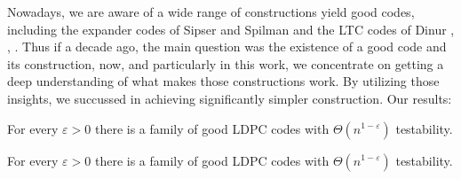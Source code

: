 
  Nowadays, we are aware of a wide range of constructions yield good codes, including the expander codes of Sipser and Spilman \cite{ExpanderCodes} and the LTC codes of Dinur \cite{Dinur}, \cite{Pavel}, \cite{leverrier2022quantum}. Thus if a decade ago, the main question was the existence of a good code and its construction, now, and particularly in this work, we concentrate on getting a deep understanding of what makes those constructions work. By utilizing those insights, we succussed in achieving significantly simpler construction. Our results: 

  \begin{theorem} \label{thm} For every $\varepsilon > 0 $ there is a family of good LDPC codes with $\Theta\left( n^{1-\varepsilon} \right)$ testability. 
  \end{theorem}

\begin{theorem} \label{thm} For every $\varepsilon > 0 $ there is a family of good LDPC codes with $\Theta\left( n^{1-\varepsilon} \right)$ testability. 
  \end{theorem}


